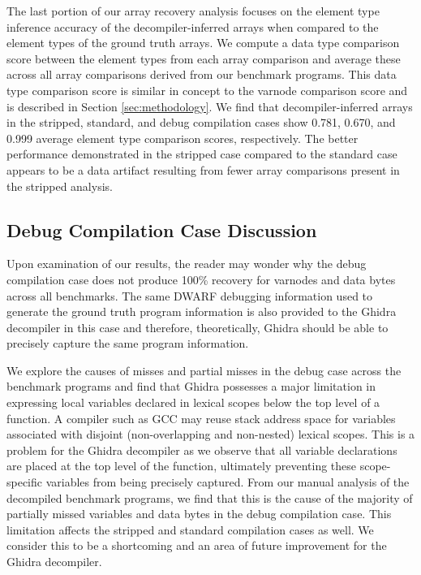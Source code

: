 \documentclass[a4paper,twoside]{article}
\begin{document}
The last portion of our array recovery analysis focuses on the element type inference accuracy of the decompiler-inferred arrays when compared to the element types of the ground truth arrays. We compute a data type comparison score between the element types from each array comparison and average these across all array comparisons derived from our benchmark programs. This data type comparison score is similar in concept to the varnode comparison score and is described in Section \ref{sec:methodology}. We find that decompiler-inferred arrays in the stripped, standard, and debug compilation cases show 0.781, 0.670, and 0.999 average element type comparison scores, respectively. The better performance demonstrated in the stripped case compared to the standard case appears to be a data artifact resulting from fewer array comparisons present in the stripped analysis.

\subsection{Debug Compilation Case Discussion}

Upon examination of our results, the reader may wonder why the debug compilation case does not produce 100\% recovery for varnodes and data bytes across all benchmarks. The same DWARF debugging information used to generate the ground truth program information is also provided to the Ghidra decompiler in this case and therefore, theoretically, Ghidra should be able to precisely capture the same program information.

We explore the causes of misses and partial misses in the debug case across the benchmark programs and find that Ghidra possesses a major limitation in expressing local variables declared in lexical scopes below the top level of a function. A compiler such as GCC may reuse stack address space for variables associated with disjoint (non-overlapping and non-nested) lexical scopes. This is a problem for the Ghidra decompiler as we observe that all variable declarations are placed at the top level of the function, ultimately preventing these scope-specific variables from being precisely captured. From our manual analysis of the decompiled benchmark programs, we find that this is the cause of the majority of partially missed variables and data bytes in the debug compilation case. This limitation affects the stripped and standard compilation cases as well. We consider this to be a shortcoming and an area of future improvement for the Ghidra decompiler.
\end{document}
